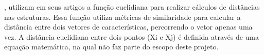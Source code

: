 ,  utilizam em seus artigos a função euclidiana para realizar cálculos de distâncias nas estruturas. Essa função utiliza métricas de similaridade para calcular a distância entre dois vetores de características, percorrendo o vetor apenas uma vez. A distância euclidiana entre dois pontos (Xi e Xj) é definida através de uma equação matemática, na qual não faz parte do escopo deste projeto.

\begin{comment}

%

Segundo \citeonline{MAIA2013}, a distância euclidiana necessita que quatro condições nos vetores de comparação A, B e C, sejam validas para atuar como medida:

\begin{enumerate}
    \item A distância do vetorA até o vetorB tem que ser maior ou igual a 0;
    \item A distância do vetorA até o vetorA tem que ser igual a 0, ou seja, os vetores tem que ser iguais;
    \item A distância do vetorA até o vetorB tem que ser igual a distância do vetorB até o vetorA;
    \item A distância do vetorA até o vetorC tem que ser menor ou igual a distância do vetorA até o vetorB mais a distância do vetorB até o vetorC.
\end{enumerate}

O autor completa que o tamanho dos vetores influencia diretamente no desempenho da função de similaridade por distância, ou euclidiana.

\clearpage

\begin{figure}[!h]
\caption{{\footnotesize Exemplo do uso da distância Euclidiana.}}
 
\centering %
\texttt{[image: revisao-bibliografica/Figuras/Euclidiana.jpg]}%
\label{figura:figura8}

\centering \subfloat {\footnotesize {Adaptado de: http://www.dsc.ufcg.edu.br/~pet/jornal/novembro2012/materias/recapitulando.html}}
{
\label{figura:figura8}
}
\end{figure}
\end{comment}